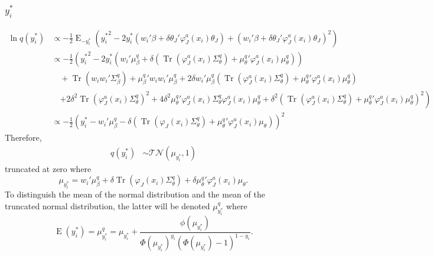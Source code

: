 \documentclass[11pt]{article}
\DeclareMathOperator{\Tr}{Tr}
\newcommand{\opn}{\operatorname}
\begin{document}
\subsubsection{$y_{i}^{*}$}
  \begin{align*}
    \ln q\left(y_{i}^{*}\right) &\propto -\frac{1}{2}\opn{E}_{-y_{i}^{*}}\left({y_{i}^{*}}^{2} -2y_{i}^{*}\left(w_{i}'\beta +\delta\theta_{J}'\varphi_{J}^{a}\left(x_{i}\right)\theta_{J}\right)+\left(w_{i}'\beta + \delta\theta_{J}'\varphi_{J}^{a}\left(x_{i}\right)\theta_{J}\right)^{2}\right)\\
    &\propto -\frac{1}{2}\left({y_{i}^{*}}^{2} -2y_{i}^{*}\left(w_{i}'\mu_{\beta}^{q} +\delta\left(\Tr\left(\varphi_{J}^{a}\left(x_{i}\right)\Sigma_{\theta}^{q}\right)+{\mu_{\theta}^{q}}'\varphi_{J}^{a}\left(x_{i}\right)\mu_{\theta}^{q}\right)\right)\right.\\
    &\quad  +\Tr\left(w_{i}w_{i}'\Sigma_{\beta}^{q}\right) + {\mu_{\beta}^{q}}'w_{i}w_{i}'\mu_{\beta}^{q} + 2\delta w_{i}'\mu_{\beta}^{q}\left(\Tr\left(\varphi_{J}^{a}\left(x_{i}\right)\Sigma_{\theta}^{q}\right)+ {\mu_{\theta}^{q}}'\varphi_{J}^{a}\left(x_{i}\right)\mu_{\theta}^{q}\right)\\
    &\quad \left. +2\delta^{2}\Tr\left(\varphi_{J}^{a}\left(x_{i}\right)\Sigma_{\theta}^{q}\right)^{2} + 4\delta^{2}{\mu_{\theta}^{q}}'\varphi_{J}^{a}\left(x_{i}\right)\Sigma_{\theta}^{q}\varphi_{J}^{a}\left(x_{i}\right)\mu_{\theta}^{q} + \delta^{2}\left(\Tr\left(\varphi_{J}^{a}\left(x_{i}\right)\Sigma_{\theta}^{q}\right)+ {\mu_{\theta}^{q}}'\varphi_{J}^{a}\left(x_{i}\right)\mu_{\theta}^{q}\right)^{2}\right)\\
    &\propto -\frac{1}{2}\left(y_{i}^{*} - w_{i}'\mu_{\beta}^{q} - \delta\left(\Tr\left(\varphi_{J}\left(x_{i}\right)\Sigma_{\theta}^{q}\right)+{\mu_{\theta}^{q}}'\varphi_{J}^{a}\left(x_{i}\right)\mu_{\theta}\right)\right)^{2}
  \end{align*}
Therefore,
  \begin{align*}
    q\left(y_{i}^{*}\right) &\sim \mathcal{TN}\left(\mu_{y_{i}^{*}}, 1\right)
  \end{align*}
truncated at zero where
  $$
    \mu_{y_{i}^{*}} = w_{i}'\mu_{\beta}^{q} + \delta\Tr\left(\varphi_{J}\left(x_{i}\right)\Sigma_{\theta}^{q}\right)+\delta{\mu_{\theta}^{q}}'\varphi_{J}^{a}\left(x_{i}\right)\mu_{\theta}.
  $$
To distinguish the mean of the normal distribution and the mean of the truncated normal distribution, the latter will be denoted $\mu_{y_{i}^{*}}^{q}$ where
  $$
    \opn{E}\left(y_{i}^{*}\right) = \mu_{y_{i}^{*}}^{q} = \mu_{y_{i}^{*}} + \frac{\phi\left(\mu_{y_{i}^{*}}\right)}{\Phi\left(\mu_{y_{i}^{*}}\right)^{y_{i}}\left(\Phi\left(\mu_{y_{i}^{*}}\right)-1\right)^{1-y_{i}}}.
  $$
\end{document}
